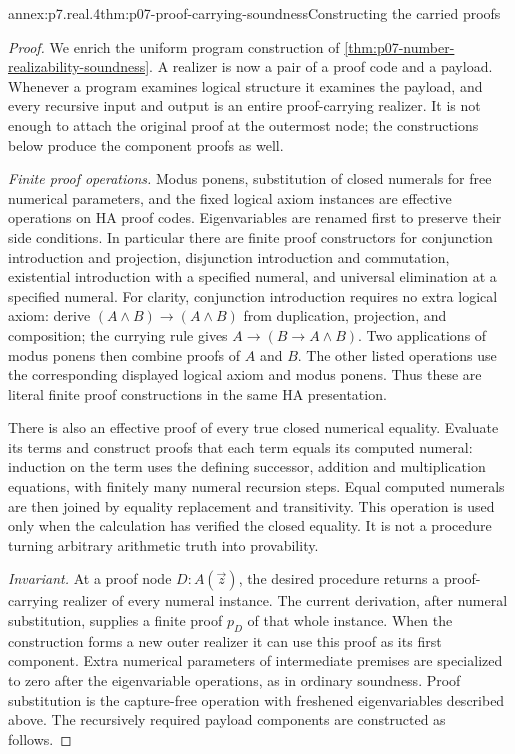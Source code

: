 \begin{annexitem}{annex:p7.real.4}{thm:p07-proof-carrying-soundness}{Constructing the carried proofs}
\begin{proof}
We enrich the uniform program construction of
\cref{thm:p07-number-realizability-soundness}. A realizer is now a
pair of a proof code and a payload. Whenever a program examines logical
structure it examines the payload, and every recursive input and output
is an entire proof-carrying realizer. It is not enough to attach the
original proof at the outermost node; the constructions below produce
the component proofs as well.

\emph{Finite proof operations.} Modus ponens, substitution of closed
numerals for free numerical parameters, and the fixed logical axiom
instances are effective operations on HA proof codes. Eigenvariables
are renamed first to preserve their side conditions. In particular
there are finite proof constructors for conjunction introduction and
projection, disjunction introduction and commutation, existential
introduction with a specified numeral, and universal elimination at
a specified numeral. For clarity, conjunction introduction requires no
extra logical axiom: derive
\((A\land B)\to(A\land B)\) from duplication, projection, and
composition; the currying rule gives \(A\to(B\to A\land B)\).
Two applications of modus ponens then combine proofs of \(A\) and
\(B\). The other listed operations use the corresponding displayed
logical axiom and modus ponens. Thus these are literal finite proof
constructions in the same HA presentation.

There is also an effective proof of every true closed numerical
equality. Evaluate its terms and construct proofs that each term equals
its computed numeral: induction on the term uses the defining successor,
addition and multiplication equations, with finitely many numeral
recursion steps. Equal computed numerals are then joined by equality
replacement and transitivity. This operation is used only when the
calculation has verified the closed equality. It is not a procedure
turning arbitrary arithmetic truth into provability.

\emph{Invariant.} At a proof node \(D:A(\vec z)\), the desired
procedure returns a proof-carrying realizer of every numeral instance.
The current derivation, after numeral substitution, supplies a finite
proof \(p_D\) of that whole instance. When the construction forms
a new outer realizer it can use this proof as its first component.
Extra numerical parameters of intermediate premises are specialized to
zero after the eigenvariable operations, as in ordinary soundness.
Proof substitution is the capture-free operation with freshened
eigenvariables described above. The recursively required payload
components are constructed as follows.


\end{proof}
\end{annexitem}

